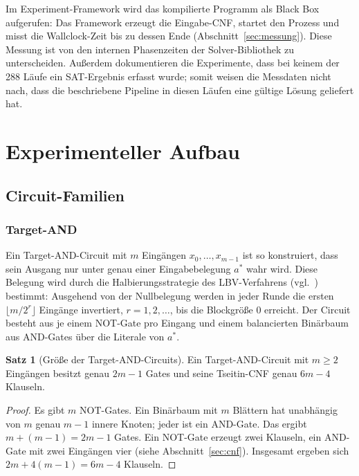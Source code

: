 \documentclass[a4paper,12pt]{article}
\theoremstyle{definition}
\newtheorem{satz}{Satz}
\begin{document}
Im Experiment-Framework wird das kompilierte Programm als Black Box aufgerufen: Das Framework erzeugt die Eingabe-CNF, startet den Prozess und misst die Wallclock-Zeit bis zu dessen Ende (Abschnitt~\ref{sec:messung}). Diese Messung ist von den internen Phasenzeiten der Solver-Bibliothek zu unterscheiden. Außerdem dokumentieren die Experimente, dass bei keinem der 288 Läufe ein SAT-Ergebnis erfasst wurde; somit weisen die Messdaten nicht nach, dass die beschriebene Pipeline in diesen Läufen eine gültige Lösung geliefert hat.

\section{Experimenteller Aufbau}
\label{sec:aufbau}

\subsection{Circuit-Familien}

\subsubsection{Target-AND}

Ein Target-AND-Circuit mit $m$ Eingängen $x_0, \ldots, x_{m-1}$ ist so konstruiert, dass sein Ausgang nur unter genau einer Eingabebelegung $a^*$ wahr wird. Diese Belegung wird durch die Halbierungsstrategie des LBV-Verfahrens (vgl.~\cite{epp2013}) bestimmt: Ausgehend von der Nullbelegung werden in jeder Runde die ersten $\lfloor m/2^r \rfloor$ Eingänge invertiert, $r = 1, 2, \ldots$, bis die Blockgröße $0$ erreicht. Der Circuit besteht aus je einem NOT-Gate pro Eingang und einem balancierten Binärbaum aus AND-Gates über die Literale von $a^*$.

\begin{satz}[Größe der Target-AND-Circuits]
	\label{satz:groesse}
	Ein Target-AND-Circuit mit $m \ge 2$ Eingängen besitzt genau $2m-1$ Gates und seine Tseitin-CNF genau $6m-4$ Klauseln.
\end{satz}

\begin{proof}
	Es gibt $m$ NOT-Gates. Ein Binärbaum mit $m$ Blättern hat unabhängig von $m$ genau $m-1$ innere Knoten; jeder ist ein AND-Gate. Das ergibt $m + (m-1) = 2m-1$ Gates. Ein NOT-Gate erzeugt zwei Klauseln, ein AND-Gate mit zwei Eingängen vier (siehe Abschnitt~\ref{sec:cnf}). Insgesamt ergeben sich $2m + 4(m-1) = 6m-4$ Klauseln.
\end{proof}
\end{document}
